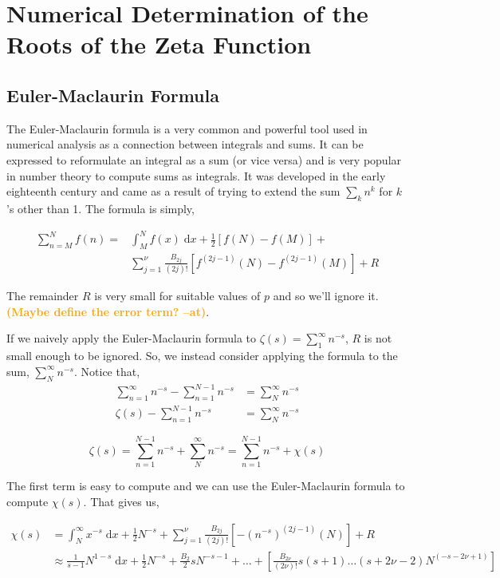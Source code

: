\documentclass{amsproc}
\newcommand{\be}{\begin{equation}}
\newcommand{\ee}{\end{equation}}
\newcommand{\df}{\; \mathrm{d}}
\newcommand{\at}[1]{\textbf{\textcolor{orange}{(#1 --at)}}}
\theoremstyle{definition}
\theoremstyle{remark}
\numberwithin{equation}{section}
\begin{document}
\section{Numerical Determination of the Roots of the Zeta Function}
\subsection{Euler-Maclaurin Formula}
The Euler-Maclaurin formula is a very common and powerful tool used in numerical analysis as a connection between integrals and sums. It can be expressed to reformulate an integral as a sum (or vice versa) and is very popular in number theory to compute sums as integrals. It was developed in the early eighteenth century and came as a result of trying to extend the sum $\sum_{k} n^k$ for $k$'s other than 1. The formula is simply,

\begin{align}
\sum_{n = M}^{N} f(n) = &\int_M^N f(x) \df x + \frac{1}{2} \left[ f(N) - f(M) \right] + \\
&\sum_{j = 1}^{\nu} \frac{B_{2j}}{ (2j)! } \left[ f^{( 2j - 1)}(N) - f^{(2j - 1)} (M) \right] + R
\end{align}

The remainder $R$ is very small for suitable values of $p$ and so we'll ignore it. \at{Maybe define the error term?}. 

If we naively apply the Euler-Maclaurin formula to $\zeta(s) = \sum_{1}^{\infty} n^{-s}$, $R$ is not small enough to be ignored. So, we instead consider applying the formula to the sum, $\sum_{N}^{\infty} n^{-s}$. Notice that,
\begin{align*}
 \sum_{n = 1}^{\infty} n^{-s} - \sum_{n = 1}^{N - 1} n^{-s} &= \sum_{N}^{\infty} n^{-s} \\
 \zeta(s) - \sum_{n = 1}^{N - 1} n^{-s} &= \sum_{N}^{\infty} n^{-s} 
\end{align*}

\be
\label{eqn:euler_main}
\zeta(s)  = \sum_{n = 1}^{N - 1} n^{-s} + \sum_{N}^{\infty} n^{-s} = \sum_{n = 1}^{N - 1} n^{-s} + \chi(s)
\ee

The first term is easy to compute and we can use the Euler-Maclaurin formula to compute $\chi(s)$. That gives us,

\begin{align*}
\chi(s) &= \int_N^{\infty} x^{-s} \df x + \frac{1}{2} N^{-s} + \sum_{j = 1}^{\nu} \frac{B_{2j}}{ (2j)! } \left[ - (n^{-s})^{(2j - 1)} (N) \right] + R \\
& \approx \frac{1}{s - 1} N^{1 - s} \df x + \frac{1}{2} N^{-s} + \frac{B_2}{2} s N^{-s - 1} + \ldots + \left[ \frac{B_{2 \nu}}{ (2\nu)! } s(s + 1)  \ldots (s + 2 \nu - 2) N^{( -s - 2\nu + 1)} \right]
\end{align*}
\end{document}
